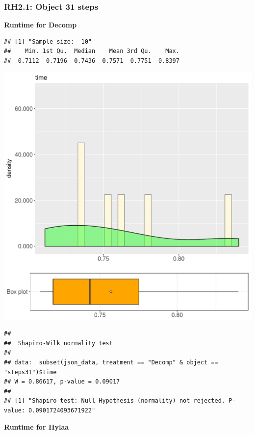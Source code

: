 \documentclass{article}\usepackage[]{graphicx}\usepackage[]{color}
\makeatletter
\def\maxwidth{ %
  \ifdim\Gin@nat@width>\linewidth
    \linewidth
  \else
    \Gin@nat@width
  \fi
}
\newenvironment{kframe}{%
 \def\at@end@of@kframe{}%
 \ifinner\ifhmode%
  \def\at@end@of@kframe{\end{minipage}}%
  \begin{minipage}{\columnwidth}%
 \fi\fi%
 \def\FrameCommand##1{\hskip\@totalleftmargin \hskip-\fboxsep
 \colorbox{shadecolor}{##1}\hskip-\fboxsep
     \hskip-\linewidth \hskip-\@totalleftmargin \hskip\columnwidth}%
 \MakeFramed {\advance\hsize-\width
   \@totalleftmargin\z@ \linewidth\hsize
   \@setminipage}}%
 {\par\unskip\endMakeFramed%
 \at@end@of@kframe}
\newenvironment{knitrout}{}{} %
\makeatother
\begin{document}
\subsubsection{RH2.1: Object 31 steps}

 \textbf{Runtime for Decomp}
\begin{knitrout}
\color{fgcolor}\begin{kframe}
\begin{verbatim}
## [1] "Sample size:  10"
##    Min. 1st Qu.  Median    Mean 3rd Qu.    Max. 
##  0.7112  0.7196  0.7436  0.7571  0.7751  0.8397
\end{verbatim}
\end{kframe}
\includegraphics[width=\maxwidth]{figure/RH2_Decomp_steps31-1} 
\begin{kframe}\begin{verbatim}
## 
## 	Shapiro-Wilk normality test
## 
## data:  subset(json_data, treatment == "Decomp" & object == "steps31")$time
## W = 0.86617, p-value = 0.09017
## 
## [1] "Shapiro test: Null Hypothesis (normality) not rejected. P-value: 0.0901724093671922"
\end{verbatim}
\end{kframe}
\end{knitrout}
 \textbf{Runtime for Hylaa}
\end{document}
